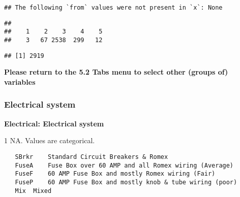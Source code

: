 \documentclass[]{article}
\newenvironment{Shaded}{\begin{snugshade}}{\end{snugshade}}
\newcommand{\KeywordTok}[1]{\textcolor[rgb]{0.13,0.29,0.53}{\textbf{#1}}}
\newcommand{\DecValTok}[1]{\textcolor[rgb]{0.00,0.00,0.81}{#1}}
\newcommand{\StringTok}[1]{\textcolor[rgb]{0.31,0.60,0.02}{#1}}
\newcommand{\CommentTok}[1]{\textcolor[rgb]{0.56,0.35,0.01}{\textit{#1}}}
\newcommand{\OperatorTok}[1]{\textcolor[rgb]{0.81,0.36,0.00}{\textbf{#1}}}
\newcommand{\NormalTok}[1]{#1}
\begin{document}
\begin{verbatim}
## The following `from` values were not present in `x`: None
\end{verbatim}

\begin{Shaded}
\end{Shaded}

\begin{verbatim}
## 
##    1    2    3    4    5 
##    3   67 2538  299   12
\end{verbatim}

\begin{Shaded}
\end{Shaded}

\begin{verbatim}
## [1] 2919
\end{verbatim}

\textbf{Please return to the 5.2 Tabs menu to select other (groups of)
variables}

\subsubsection{Electrical system}\label{electrical-system}

\textbf{Electrical: Electrical system}

1 NA. Values are categorical.

\begin{verbatim}
   SBrkr    Standard Circuit Breakers & Romex
   FuseA    Fuse Box over 60 AMP and all Romex wiring (Average) 
   FuseF    60 AMP Fuse Box and mostly Romex wiring (Fair)
   FuseP    60 AMP Fuse Box and mostly knob & tube wiring (poor)
   Mix  Mixed
\end{verbatim}

\begin{Shaded}
\end{Shaded}
\end{document}
